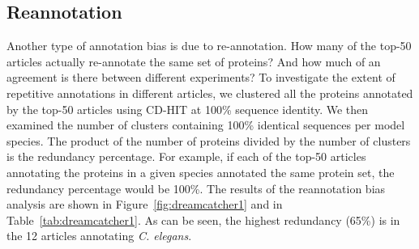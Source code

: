 \documentclass[12pt]{article}
\begin{document}

\subsection*{Reannotation}

Another type of annotation bias is due to re-annotation. How many of the top-50
articles actually re-annotate the same set of proteins? And how much of an agreement
is there between different experiments?  To investigate the extent of repetitive
annotations in different articles, we clustered all the proteins annotated by the
top-50 articles using CD-HIT\cite{cd-hit3} at 100\% sequence identity. We then
examined the number of clusters containing 100\% identical sequences per model
species. The product of the number of proteins divided by the number of clusters is
the redundancy percentage. For example, if each of the top-50 articles annotating
the proteins in a given species annotated the same protein set, the redundancy
percentage would be 100\%. The results of the reannotation bias analysis are shown
in Figure~\ref{fig:dreamcatcher1} and in Table~\ref{tab:dreamcatcher1}. As can be
seen, the highest redundancy (65\%) is in the 12 articles annotating \textit{C.
elegans}. 
\end{document}
